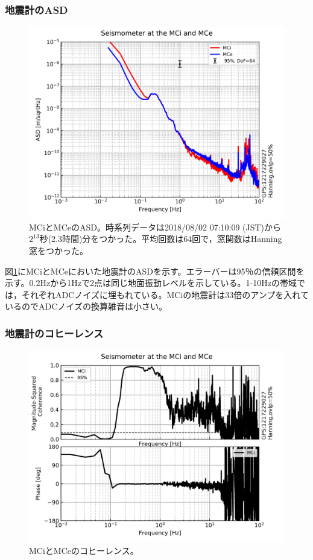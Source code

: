 \subsubsection{地震計のASD}

\begin{figure}[H]
  \begin{center}
    \includegraphics[width=11.5cm]{./cdmr/ASD-MCi_MCe.png}
  \end{center}
  \caption{MCiとMCeのASD。時系列データは2018/08/02 07:10:09 (JST)から$2^{13}$秒(2.3時間)分をつかった。平均回数は64回で，窓関数はHanning窓をつかった。}\label{img:img_asd_imc}
\end{figure}

図\ref{img:img_asd_imc}にMCiとMCeにおいた地震計のASDを示す。エラーバーは95％の信頼区間を示す。0.2Hzから1Hzで2点は同じ地面振動レベルを示している。1-10Hzの帯域では，それぞれADCノイズに埋もれている。MCiの地震計は33倍のアンプを入れているのでADCノイズの換算雑音は小さい。


\subsubsection{地震計のコヒーレンス}

\begin{figure}[H]
  \begin{center}
    \includegraphics[width=11.5cm]{./cdmr/Coherence-MCi_MCe.png}
  \end{center}
  \caption{MCiとMCeのコヒーレンス。}\label{img:img_coherence_imc}
\end{figure}


